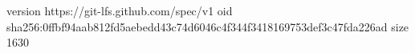 version https://git-lfs.github.com/spec/v1
oid sha256:0ffbf94aab812fd5aebedd43c74d6046c4f344f3418169753def3c47fda226ad
size 1630
